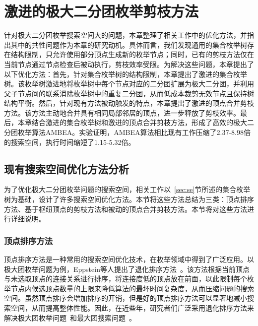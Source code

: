 \chapter{激进的极大二分团枚举剪枝方法}
\label{ch:aggressive_mbe}

针对极大二分团枚举搜索空间大的问题，本章整理了相关工作中的优化方法，并指出其中的共性问题作为本章的研究动机。具体而言，我们发现通用的集合枚举树存在结构限制，只允许使用部分顶点生成新的枚举节点；同时，已有的剪枝方法仅在当前节点通过节点检查后被动执行，剪枝效率受限。为解决这些问题，本章提出了以下优化方法：首先，针对集合枚举树的结构限制，本章提出了激进的集合枚举树。该枚举树激进地将枚举树中每个节点对应的二分团扩展为极大二分团，并利用父子节点间的联系消除枚举树中的重复二分团，从而低成本裁剪无效节点且保持树结构平衡。然后，针对现有方法被动触发的特点，本章提出了激进的顶点合并剪枝方法。该方法主动地合并具有相同局部邻居的顶点，进一步释放了剪枝效率。最后，本章结合激进的集合枚举树和激进的顶点合并剪枝方法，形成了高效的极大二分团枚举算法AMBEA。实验证明，AMBEA算法相比现有工作压缩了2.37-8.98倍的搜索空间，执行时间缩短了1.15-5.32倍。

\section{现有搜索空间优化方法分析}
\label{sec:opt}

为了优化极大二分团枚举问题的搜索空间，相关工作以~\ref{sec:se}节所述的集合枚举树为基础，设计了许多搜索空间优化方法。本节将这些方法总结为三类：顶点排序方法、基于枢纽顶点的剪枝方法和被动的顶点合并剪枝方法。本节将对这些方法进行详细说明。

\subsection{顶点排序方法}
\label{subsec:order}

顶点排序方法是一种常用的搜索空间优化技术，在枚举领域中得到了广泛应用。以极大团枚举问题为例，Eppstein等人提出了退化排序方法~\cite{MCEdegeneracy10}。该方法根据当前顶点与未选取顶点的连接关系进行排序，将连接度低的顶点放在前面，以此限制每个枚举节点内候选顶点数量的上限来降低算法的最坏时间复杂度，从而压缩问题的搜索空间。虽然顶点排序会增加排序的开销，但是好的顶点排序方法可以显著地减小搜索空间，从而提高整体性能。因此，在近些年，研究者们广泛采用退化排序方法来解决极大团枚举问题~\cite{MCEparallel20,MCE20,MCE22,MCE-GPU21,MCE-22}和最大团搜索问题~\cite{MEC20,MEC22}。



